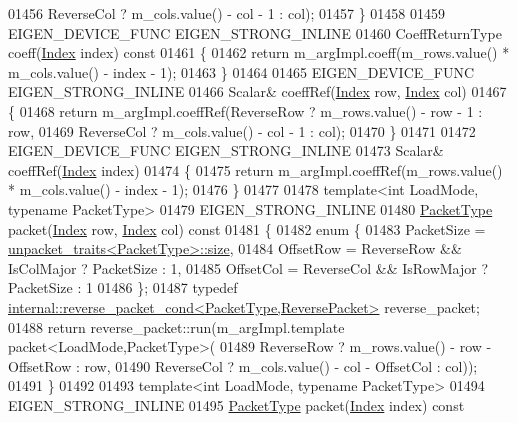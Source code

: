 \begin{DoxyCode}
01456                            ReverseCol ? m\_cols.value() - col - 1 : col);
01457   \}
01458 
01459   EIGEN\_DEVICE\_FUNC EIGEN\_STRONG\_INLINE
01460   CoeffReturnType coeff(\hyperlink{namespace_eigen_a62e77e0933482dafde8fe197d9a2cfde}{Index} index)\textcolor{keyword}{ const}
01461 \textcolor{keyword}{  }\{
01462     \textcolor{keywordflow}{return} m\_argImpl.coeff(m\_rows.value() * m\_cols.value() - index - 1);
01463   \}
01464 
01465   EIGEN\_DEVICE\_FUNC EIGEN\_STRONG\_INLINE
01466   Scalar& coeffRef(\hyperlink{namespace_eigen_a62e77e0933482dafde8fe197d9a2cfde}{Index} row, \hyperlink{namespace_eigen_a62e77e0933482dafde8fe197d9a2cfde}{Index} col)
01467   \{
01468     \textcolor{keywordflow}{return} m\_argImpl.coeffRef(ReverseRow ? m\_rows.value() - row - 1 : row,
01469                               ReverseCol ? m\_cols.value() - col - 1 : col);
01470   \}
01471 
01472   EIGEN\_DEVICE\_FUNC EIGEN\_STRONG\_INLINE
01473   Scalar& coeffRef(\hyperlink{namespace_eigen_a62e77e0933482dafde8fe197d9a2cfde}{Index} index)
01474   \{
01475     \textcolor{keywordflow}{return} m\_argImpl.coeffRef(m\_rows.value() * m\_cols.value() - index - 1);
01476   \}
01477 
01478   \textcolor{keyword}{template}<\textcolor{keywordtype}{int} LoadMode, \textcolor{keyword}{typename} PacketType>
01479   EIGEN\_STRONG\_INLINE
01480   \hyperlink{struct_eigen_1_1_packet_type}{PacketType} packet(\hyperlink{namespace_eigen_a62e77e0933482dafde8fe197d9a2cfde}{Index} row, \hyperlink{namespace_eigen_a62e77e0933482dafde8fe197d9a2cfde}{Index} col)\textcolor{keyword}{ const}
01481 \textcolor{keyword}{  }\{
01482     \textcolor{keyword}{enum} \{
01483       PacketSize = \hyperlink{struct_eigen_1_1internal_1_1unpacket__traits}{unpacket\_traits<PacketType>::size},
01484       OffsetRow  = ReverseRow && IsColMajor ? PacketSize : 1,
01485       OffsetCol  = ReverseCol && IsRowMajor ? PacketSize : 1
01486     \};
01487     \textcolor{keyword}{typedef} \hyperlink{struct_eigen_1_1internal_1_1reverse__packet__cond}{internal::reverse\_packet\_cond<PacketType,ReversePacket>}
       reverse\_packet;
01488     \textcolor{keywordflow}{return} reverse\_packet::run(m\_argImpl.template packet<LoadMode,PacketType>(
01489                                   ReverseRow ? m\_rows.value() - row - OffsetRow : row,
01490                                   ReverseCol ? m\_cols.value() - col - OffsetCol : col));
01491   \}
01492 
01493   \textcolor{keyword}{template}<\textcolor{keywordtype}{int} LoadMode, \textcolor{keyword}{typename} PacketType>
01494   EIGEN\_STRONG\_INLINE
01495   \hyperlink{struct_eigen_1_1_packet_type}{PacketType} packet(\hyperlink{namespace_eigen_a62e77e0933482dafde8fe197d9a2cfde}{Index} index)\textcolor{keyword}{ const}

\end{DoxyCode}
